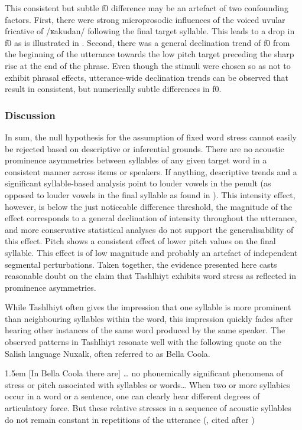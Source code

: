 This consistent but subtle f0 difference may be an artefact of two confounding factors. First, there were strong microprosodic influences of the voiced uvular fricative of /ʁakudan/ following the final target syllable. This leads to a drop in f0 as is illustrated in . Second, there was a general declination trend of f0 from the beginning of the utterance towards the low pitch target preceding the sharp rise at the end of the phrase. Even though the stimuli were chosen so as not to exhibit phrasal effects, utterance-wide declination trends can be observed that result in consistent, but numerically subtle differences in f0.

\subsubsection{Discussion}
In sum, the null hypothesis for the assumption of fixed word stress cannot easily be rejected based on descriptive or inferential grounds. There are no acoustic prominence asymmetries between syllables of any given target word in a consistent manner across items or speakers. If anything, descriptive trends and a significant syllable-based analysis point to louder vowels in the penult (as opposed to louder vowels in the final syllable as found in \citealt{GordonNafi2012}). This intensity effect, however, is below the just noticeable difference threshold, the magnitude of the effect corresponds to a general declination of intensity throughout the utterance, and more conservative statistical analyses do not support the generalisability of this effect. Pitch shows a consistent effect of lower pitch values on the final syllable. This effect is of low magnitude and probably an artefact of independent segmental perturbations. Taken together, the evidence presented here casts reasonable doubt on the claim that Tashlhiyt exhibits word stress as reflected in prominence asymmetries.

While Tashlhiyt often gives the impression that one syllable is more prominent than neighbouring syllables within the word, this impression quickly fades after hearing other instances of the same word produced by the same speaker. The observed patterns in Tashlhiyt resonate well with the following quote on the Salish language Nuxalk, often referred to as Bella Coola.

\begin{indentquote}{1.5em}
 [In Bella Coola there are] … no phonemically significant phenomena of stress or pitch associated with syllables or words… When two or more syllabics occur in a word or a sentence, one can clearly hear different degrees of articulatory force. But these relative stresses in a sequence of acoustic syllables do not remain constant in repetitions of the utterance (\citealt[132]{Newman1947}, cited after \citealt[57]{Hyman2014})
\end{indentquote}

